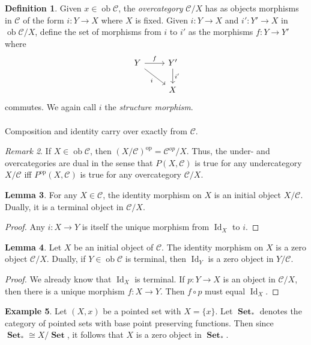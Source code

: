 \documentclass[10pt,letterpaper,cm]{nupset}
\theoremstyle{definition}
\newtheorem{definition}{Definition}
\newtheorem{exmp}[definition]{Example}
\theoremstyle{theorem}
\newtheorem{lemma}[definition]{Lemma}
\theoremstyle{remark}
\newtheorem{remark}[definition]{Remark}
\newcommand{\1}{\mathbf{1}}
\renewcommand{\c}{\mathscr{C}}
\newcommand{\0}{\vec 0}
\DeclareMathOperator{\id}{Id}
\DeclareMathOperator{\op}{op}
\DeclareMathOperator{\ob}{ob}
\DeclareMathOperator{\set}{\mathbf{Set}}
\begin{document}
\begin{definition}
Given $x \in \ob \c$, the \textit{overcategory} ${\c}/{X}$ has as objects morphisms in $\c$ of the form $i : Y \to X$ where $X$ is fixed. Given $i:  Y \to X$ and  $i' : Y' \to X$ in $\ob {\c}/{X}$, define the set of morphisms from $i$ to $i'$ as the morphisms $f: Y \to Y'$ where
\[ \begin{tikzcd}
Y \arrow[r, "f"] \arrow[swap, dr,  " i "] & Y' \arrow[d, "i '"] \\%
 & X
\end{tikzcd}
\]
commutes. We again call $i$ the \textit{structure morphism}.
\\ \\ Composition and identity carry over exactly from $\c$.
\end{definition}

\begin{remark}
If $X \in \ob \c$, then $({X}/{\c})^{\op} = {\c^{op}}/{X}$. Thus, the under- and overcategories are dual in the sense that $P(X, \c)$ is true for any undercategory ${X}/{\c}$ iff $P^{\op}(X, \c)$ is true for any overcategory ${\c}/{X}$. 
\end{remark}

\begin{lemma}
For any $X \in \c$, the identity morphism on $X$ is an initial object ${X}/{\c}$. Dually, it is a terminal object in ${\c}/{X}$.
\end{lemma}
\begin{proof}
Any $i: X \to Y$ is itself the unique morphism from $\id_X$ to $i$.
\end{proof}

\begin{lemma}
Let $X$ be an initial object of $\c$. The identity morphism on $X$ is a zero object ${\c}/{X}$. Dually, if $Y \in \ob \c$ is terminal, then $\id_Y$ is a zero object in ${Y}/{\c}$.
\end{lemma}
\begin{proof}
We already know that $\id_X$ is terminal. If $p: Y \to X$ is an object in ${\c}/{X}$, then there is a unique morphism $f: X \to Y$. Then $f\circ p$ must equal $\id_X$.
\end{proof}

\begin{exmp}
Let $(X, x)$ be a pointed set with $X= \{x\}$. Let $\set_{\ast}$ denotes the category of pointed sets with base point preserving functions. Then since $\set_{\ast} \cong {X}/{\set}$, it follows that $X$ is a zero object in $\set_{\ast}$.
\end{exmp}
\end{document}
